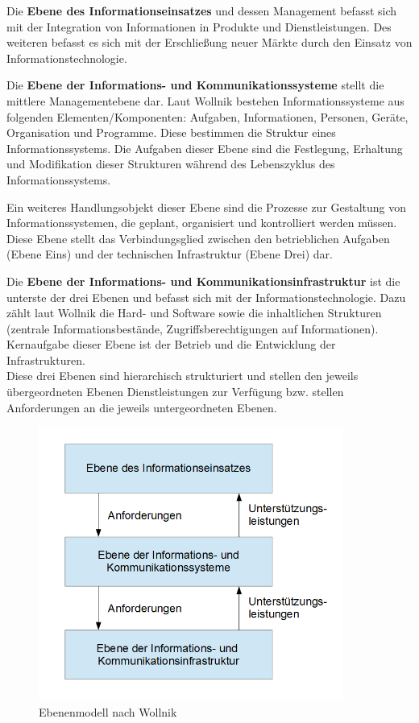 Die \textbf{Ebene des Informationseinsatzes} und dessen Management befasst sich mit der Integration von Informationen in Produkte und Dienstleistungen. Des weiteren befasst es sich mit der Erschließung neuer Märkte durch den Einsatz von Informationstechnologie.

Die \textbf{Ebene der Informations- und Kommunikationssysteme} stellt die mittlere Managementebene dar. Laut Wollnik bestehen Informationssysteme aus folgenden Elementen/Komponenten: Aufgaben, Informationen, Personen, Geräte, Organisation und Programme. Diese bestimmen die Struktur eines Informationssystems. Die Aufgaben dieser Ebene sind die Festlegung, Erhaltung und Modifikation dieser Strukturen während des Lebenszyklus des Informationssystems.

Ein weiteres Handlungsobjekt dieser Ebene sind die Prozesse zur Gestaltung von Informationssystemen, die geplant, organisiert und kontrolliert werden müssen. Diese Ebene stellt das Verbindungsglied zwischen den betrieblichen Aufgaben (Ebene Eins) und der technischen Infrastruktur (Ebene Drei) dar.

Die \textbf{Ebene der Informations- und Kommunikationsinfrastruktur} ist die unterste der drei Ebenen 
und befasst sich mit der Informationstechnologie. 
Dazu zählt laut Wollnik die Hard- und Software sowie die inhaltlichen Strukturen (zentrale Informationsbestände, Zugriffsberechtigungen auf Informationen). Kernaufgabe dieser Ebene ist der Betrieb und die Entwicklung der Infrastrukturen.\\

Diese drei Ebenen sind hierarchisch strukturiert und stellen den jeweils übergeordneten Ebenen Dienstleistungen zur Verfügung bzw. stellen Anforderungen an die jeweils untergeordneten Ebenen. 

\begin{figure}[h!]
	\centering
	\includegraphics[width=10cm]{kapitel/gruppe1_1/bilder/ebenenmodell_wollnik}
	\caption{Ebenenmodell nach Wollnik}
	\label{fig_ebenenmodell_wollnik}
\end{figure}

